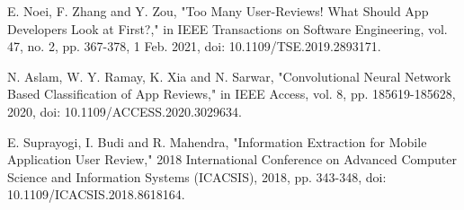 \documentclass[a4paper,10pt, bibliography=totocnumbered]{scrreprt}
\begin{document}
\begin{thebibliography}{9}
E. Noei, F. Zhang and Y. Zou, "Too Many User-Reviews! What Should App Developers Look at First?," in IEEE Transactions on Software Engineering, vol. 47, no. 2, pp. 367-378, 1 Feb. 2021, doi: 10.1109/TSE.2019.2893171.

N. Aslam, W. Y. Ramay, K. Xia and N. Sarwar, "Convolutional Neural Network Based Classification of App Reviews," in IEEE Access, vol. 8, pp. 185619-185628, 2020, doi: 10.1109/ACCESS.2020.3029634.

E. Suprayogi, I. Budi and R. Mahendra, "Information Extraction for Mobile Application User Review," 2018 International Conference on Advanced Computer Science and Information Systems (ICACSIS), 2018, pp. 343-348, doi: 10.1109/ICACSIS.2018.8618164.

\end{thebibliography}

\listoffigures

\listoftables
\end{document}

